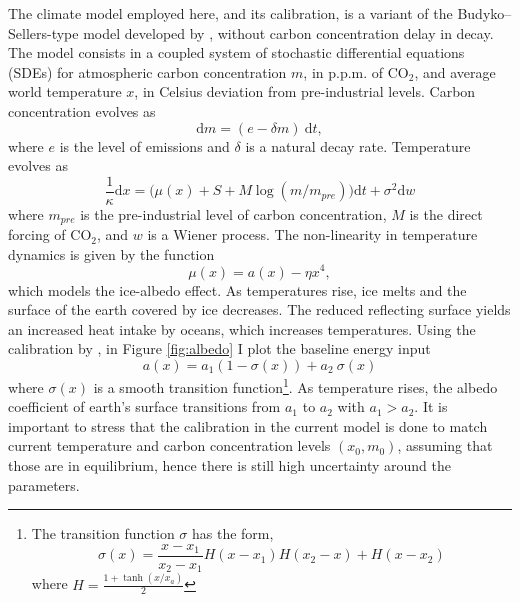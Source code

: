 \documentclass[../../main.tex]{subfiles}
\begin{document}
The climate model employed here, and its calibration, is a variant of the Budyko–Sellers-type model developed by , without carbon concentration delay in decay. The model consists in a coupled system of stochastic differential equations (SDEs) for atmospheric carbon concentration $m$, in p.p.m. of CO$_2$, and average world temperature $x$, in Celsius deviation from pre-industrial levels. Carbon concentration evolves as \begin{equation} \label{eq:climate-model-c}
    \text{d}m = (e - \delta m) \ \text{d} t,
\end{equation} where $e$ is the level of emissions and $\delta$ is a natural decay rate. Temperature evolves as \begin{equation} \label{eq:climate-model-x}
    \frac{1}{\kappa} \text{d}x = \Big( \mu(x) + S + M \log(m / m_{pre}) \Big) \text{d} t + \sigma^2 \text{d}w
\end{equation} where $m_{pre}$ is the pre-industrial level of carbon concentration, $M$ is the direct forcing of CO$_2$, and $w$ is a Wiener process. The non-linearity in temperature dynamics is given by the function \begin{equation}
    \mu(x) = a(x) - \eta x^4,
\end{equation} which models the ice-albedo effect. As temperatures rise, ice melts and the surface of the earth covered by ice decreases. The reduced reflecting surface yields an increased heat intake by oceans, which increases temperatures. Using the calibration by , in Figure \ref{fig:albedo} I plot the baseline energy input\begin{equation}
    a(x) = a_1 (1 - \sigma(x)) + a_2 \ \sigma(x)
\end{equation} where $\sigma(x)$ is a smooth transition function\footnote{
    The transition function $\sigma$ has the form,
    \begin{equation}
        \sigma(x) = \frac{x - x_1}{x_2 - x_1} H(x - x_1) H(x_2 - x) + H(x - x_2)
    \end{equation}
    where $H = \frac{1 + \tanh(x / x_a)}{2} $
}. As temperature rises, the albedo coefficient of earth's surface transitions from $a_1$ to $a_2$ with $a_1 > a_2$. It is important to stress that the calibration in the current model is done to match current temperature and carbon concentration levels $(x_0, m_0)$, assuming that those are in equilibrium, hence there is still high uncertainty around the parameters.
\end{document}
